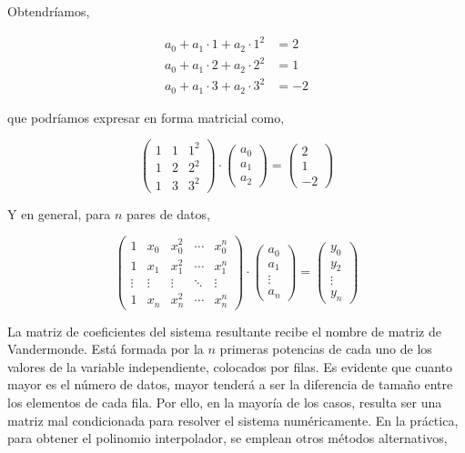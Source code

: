 Obtendríamos,

\begin{align*}
a_0+a_1\cdot 1+ a_2\cdot 1^2&=2\\
a_0+a_1\cdot 2+ a_2\cdot 2^2&=1\\
a_0+a_1\cdot 3+ a_2\cdot 3^2&=-2
\end{align*}

que podríamos expresar en forma matricial como,



\begin{equation*}
\begin{pmatrix}
1&1&1^2\\
1&2&2^2\\
1&3&3^2
\end{pmatrix}\cdot \begin{pmatrix}
a_0\\
a_1\\
a_2
\end{pmatrix}=\begin{pmatrix}
2\\
1\\
-2
\end{pmatrix}
\end{equation*}

Y en general, para $n$ pares de datos,

\begin{equation*}
\begin{pmatrix}
1&x_0&x_0^2&\cdots &x_0^n\\
1&x_1&x_1^2&\cdots &x_1^n\\
\vdots&\vdots&\vdots&\ddots&\vdots\\
1&x_n&x_n^2&\cdots &x_n^n
\end{pmatrix}\cdot \begin{pmatrix}
a_0\\
a_1\\
\vdots\\
a_n

\end{pmatrix}=\begin{pmatrix}
y_0\\
y_2\\
\vdots\\
y_n
\end{pmatrix}
\end{equation*}

La matriz de coeficientes del sistema resultante recibe el nombre de matriz de Vandermonde. Está formada por la $n$ primeras potencias de cada uno de los valores de la variable independiente, colocados por filas. Es evidente que cuanto mayor es el número de datos, mayor tenderá a ser la diferencia de tamaño entre los elementos de cada fila. Por ello, en la mayoría de los casos, resulta ser una matriz mal condicionada para resolver el sistema numéricamente. En la práctica, para obtener el polinomio interpolador, se emplean otros métodos alternativos,

